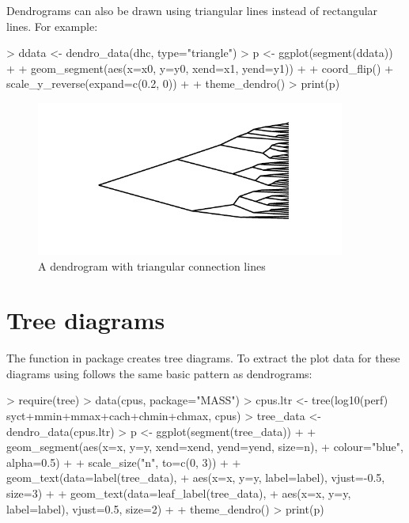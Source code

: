 \documentclass[10pt,oneside]{article}
\begin{document}
Dendrograms can also be drawn using triangular lines instead of rectangular lines.  For example:

\begin{Schunk}
\begin{Sinput}
> ddata <- dendro_data(dhc, type="triangle")
> p <- ggplot(segment(ddata)) + 
+     geom_segment(aes(x=x0, y=y0, xend=x1, yend=y1)) + 
+     coord_flip() + scale_y_reverse(expand=c(0.2, 0)) +
+     theme_dendro()
> print(p)
\end{Sinput}
\end{Schunk}

\begin{figure}[h]
\begin{center}
\includegraphics[width=4in, height=2in]{ggdendro-dendro3}
\end{center}
\caption{A dendrogram with triangular connection lines}
\end{figure}

  

\section{Tree diagrams}

The  function in package  creates tree diagrams.  To extract the plot data for these diagrams using \ggdendro{} follows the same basic pattern as dendrograms: 

\begin{Schunk}
\begin{Sinput}
> require(tree)
> data(cpus, package="MASS")
> cpus.ltr <- tree(log10(perf) ~ syct+mmin+mmax+cach+chmin+chmax, cpus)
> tree_data <- dendro_data(cpus.ltr)
> p <- ggplot(segment(tree_data)) +
+     geom_segment(aes(x=x, y=y, xend=xend, yend=yend, size=n), 
+         colour="blue", alpha=0.5) +
+     scale_size("n", to=c(0, 3)) +
+     geom_text(data=label(tree_data), 
+         aes(x=x, y=y, label=label), vjust=-0.5, size=3) +
+     geom_text(data=leaf_label(tree_data), 
+         aes(x=x, y=y, label=label), vjust=0.5, size=2) +
+     theme_dendro()
> print(p)
\end{Sinput}
\end{Schunk}
\end{document}

